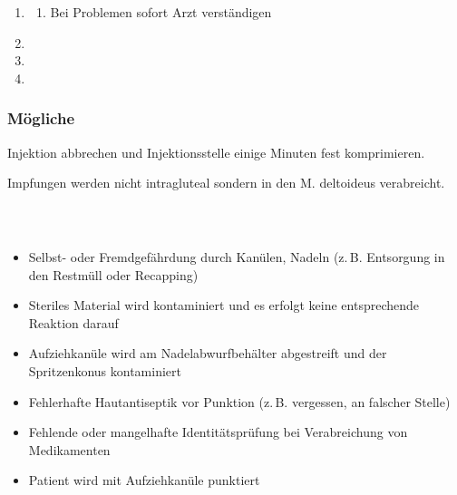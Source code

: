 \begin{FamPropHandlungsschritte}
\begin{enumerate}
  \begin{enumerate}
    \item Wundpflaster
  \end{enumerate}
  \item {}
  \begin{enumerate}
    \item Bei Problemen sofort Arzt verständigen
  \end{enumerate}
  \item {}
  \item {}
  \item {}
\end{enumerate}
\end{FamPropHandlungsschritte}





\subsubsection{Mögliche }


{Injektion abbrechen und
Injektionsstelle einige Minuten fest komprimieren.}
{}
{}
{}
{}

\begin{Danger}
  \item Impfungen werden nicht intragluteal sondern in den M. deltoideus
  verabreicht.
\end{Danger}





\subsubsection{\RoteKarte\ }
\begin{FamPropFallstricke}
\begin{itemize}
  \item[\RoteKarte] Selbst- oder Fremdgefährdung durch
  Kanülen, Nadeln (z.\,B. Entsorgung in den Restmüll oder Recapping)
  \item[\RoteKarte] Steriles Material wird kontaminiert und
  es erfolgt keine entsprechende Reaktion darauf
  \item[\RoteKarte] Aufziehkanüle wird am
  Nadelabwurfbehälter abgestreift und der Spritzenkonus kontaminiert
  \item[\RoteKarte] Fehlerhafte Hautantiseptik vor Punktion
  (z.\,B. vergessen, an falscher Stelle)
  \item[\RoteKarte] Fehlende oder mangelhafte
  Identitätsprüfung bei Verabreichung von Medikamenten
  \item[\RoteKarte] Patient wird mit Aufziehkanüle punktiert
\end{itemize}
\end{FamPropFallstricke}



